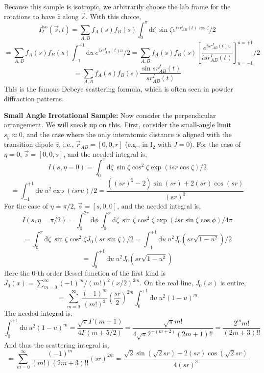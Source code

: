 \documentclass[fleqn,oneside,12pt]{article}
\begin{document}
Because this sample is isotropic, we arbitrarily choose the lab frame for the
rotations to have $\hat z$ along $\vec s$. With this choice,
\[
I_{I}^{\mathrm{iso}} (\vec s, t)
=
\sum_{A,B}
f_{A} (s)
f_{B} (s)
\int_{0}^{\pi}
\mathrm{d} \zeta \
\sin \zeta
e^{i s r_{AB}^{I} (t) \cos \zeta}
/ 2
\]
\[
=
\sum_{A,B}
f_{A} (s)
f_{B} (s)
\int_{-1}^{+1}
\mathrm{d} u \
e^{i s r_{AB}^{I} (t) u}
/ 2
=
\sum_{A,B}
f_{A} (s)
f_{B} (s)
\left [
\frac{e^{i s r_{AB}^{I} (t) u}}
{i s r_{AB}^{I} (t)}
\right ]_{u=-1}^{u=+1}
/ 2
\]
\[
=
\sum_{A,B}
f_{A} (s)
f_{B} (s)
\frac{\sin s r_{AB}^{I} (t)}{s r_{AB}^{I} (t)}
\]
This is the famous Debeye scattering formula, which is often seen in powder
diffraction patterns.

\textbf{Small Angle Irrotational Sample:} Now consider the perpendicular
arrangement. We will sneak up on this. First, consider the small-angle limit
$s_{y} \approx 0$, and the case where the only interatomic distance is aligned
with the transition dipole $\hat z$, i.e., $\vec r_{AB} = [0, 0, r]$ (e.g., in
I$_2$ with $J=0$). For the case of $\eta = 0$, $\vec s = [0, 0, s]$, and the
needed integral is,
\[
I (s, \eta=0)
=
\int_{0}^{\pi}
\mathrm{d} \zeta \
\sin \zeta
\cos^2 \zeta
\exp(i s r \cos \zeta)
/ 2
\]
\[
=
\int_{-1}^{+1}
\mathrm{d} u \
u^2
\exp(i s r u)
/ 2
=
\frac{
((sr)^2 - 2) \sin (sr)
+
2 (sr) \cos (sr)
}{
(sr)^3
}
\]
For the case of $\eta = \pi / 2$, $\vec s = [s, 0, 0]$, and the needed integral
is,
\[
I (s, \eta = \pi / 2)
=
\int_{0}^{2 \pi}
\mathrm{d} \phi \
\int_{0}^{\pi}
\mathrm{d} \zeta \
\sin \zeta
\cos^2 \zeta
\exp (
i 
s
r
\sin \zeta
\cos \phi
)
/ 4 \pi
\]
\[
=
\int_{0}^{\pi}
\mathrm{d} \zeta \
\sin \zeta
\cos^2 \zeta
J_{0} (sr \sin \zeta) / 2
=
\int_{-1}^{+1}
\mathrm{d} u \
u^2
J_{0} (sr \sqrt{1 - u^2}) / 2
\]
\[
=
\int_{0}^{+1}
\mathrm{d} u \
u^2
J_{0} (sr \sqrt{1 - u^2}) 
\]
Here the 0-th order Bessel function of the first kind is $J_{0} (x) =
\sum_{m=0}^{\infty} (-1)^{m} / (m!)^2 (x / 2)^{2m}$. On the real line, $J_{0}
(x)$ is entire,
\[
=
\sum_{m=0}^{\infty}
\frac{(-1)^{m}}{(m!)^2}
\left (
\frac{sr}{2}
\right )^{2m}
\int_{0}^{+1}
\mathrm{d} u \
u^2 (1 - u)^m
\]
The needed integral is,
\[
\int_{0}^{+1}
\mathrm{d} u \
u^2 (1 - u)^m
=
\frac{\sqrt{\pi} \Gamma (m + 1)}{4 \Gamma (m + 5/2)}
=
\frac{\sqrt{\pi} m!}{4 \sqrt{\pi} 2^{-(m + 2)} (2m + 1)!!}
=
\frac{2^{m} m!}{(2m + 3)!!}
\]
And thus the scattering integral is,
\[
=
\sum_{m=0}^{\infty}
\frac{(-1)^{m}}{(m!) (2m + 3)!!}
\left (
sr
\right )^{2m}
=
\frac{
\sqrt{2}
\sin(\sqrt{2} sr)
-
2 (sr)
\cos (\sqrt{2} sr)
}{
4 (sr)^3
}
\]
\end{document}
